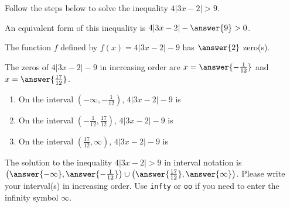 \documentclass{ximera}
\author{Kenneth Berglund}
\begin{document}
Follow the steps below to solve the inequality $4|3x - 2| > 9$.
\begin{exercise}
An equivalent form of this inequality is $4|3x - 2| - \answer{9} > 0$. 

\begin{exercise}
The function $f$ defined by $f(x) = 4|3x - 2| - 9$ has $\answer{2}$ zero(s).

\begin{exercise}
The zeros of $4|3x - 2| - 9$ in increasing order are $x = \answer{-\frac{1}{12}}$ and $x = \answer{\frac{17}{12}}$.

\begin{exercise}
\begin{enumerate}
\item On the interval $\left(-\infty, -\frac{1}{12}\right)$, $4|3x - 2| - 9$ is 
\begin{multipleChoice}  
\end{multipleChoice} 

\item On the interval $\left(-\frac{1}{12}, \frac{17}{12}\right)$, $4|3x - 2| - 9$ is 
\begin{multipleChoice}  
\end{multipleChoice} 

\item On the interval $\left(\frac{17}{12}, \infty\right)$, $4|3x - 2| - 9$ is 
\begin{multipleChoice}  
\end{multipleChoice} 

\end{enumerate}

\begin{exercise}
The solution to the inequality $4|3x - 2| > 9$ in interval notation is $\left(\answer{-\infty}, \answer{-\frac{1}{12}}\right) \cup \left(\answer{\frac{17}{12}}, \answer{\infty}\right)$. Please write your interval(s) in increasing order. Use \verb+infty+ or \verb+oo+ if you need to enter the infinity symbol $\infty$.
\end{exercise}

\end{exercise}
\end{exercise}
\end{exercise}

\end{exercise}
\end{document}
